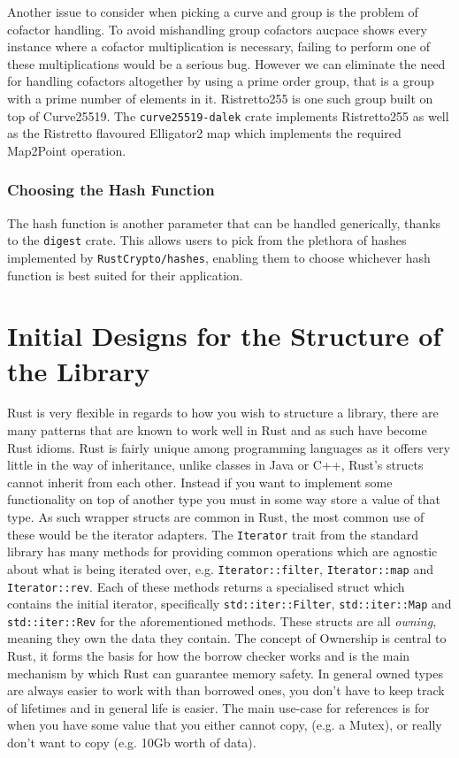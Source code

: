 Another issue to consider when picking a curve and group is the problem of cofactor handling.
To avoid mishandling group cofactors \gls{aucpace} shows every instance where a cofactor multiplication is necessary, failing to perform one of these multiplications would be a serious bug.
However we can eliminate the need for handling cofactors altogether by using a prime order group, that is a group with a prime number of elements in it.
Ristretto255 \cite{ristretto255} is one such group built on top of Curve25519.
The \texttt{curve25519-dalek} crate implements Ristretto255 as well as the Ristretto flavoured Elligator2 map \cite{elligator2} which implements the required \textsf{Map2Point} operation.

\subsubsection{Choosing the Hash Function}
The hash function is another parameter that can be handled generically, thanks to the \texttt{digest} crate.
This allows users to pick from the plethora of hashes implemented by \texttt{RustCrypto/hashes}, enabling them to choose whichever hash function is best suited for their application.

\section{Initial Designs for the Structure of the Library}
Rust is very flexible in regards to how you wish to structure a library, there are many patterns that are known to work well in Rust and as such have become Rust idioms.
Rust is fairly unique among programming languages as it offers very little in the way of inheritance, unlike classes in Java or C++, Rust's structs cannot inherit from each other.
Instead if you want to implement some functionality on top of another type you must in some way store a value of that type.
As such wrapper structs are common in Rust, the most common use of these would be the iterator adapters.
The \texttt{Iterator} trait from the standard library has many methods for providing common operations which are agnostic about what is being iterated over, e.g. \texttt{Iterator::filter}, \texttt{Iterator::map} and \texttt{Iterator::rev}.
Each of these methods returns a specialised struct which contains the initial iterator, specifically \texttt{std::iter::Filter}, \texttt{std::iter::Map} and \texttt{std::iter::Rev} for the aforementioned methods.
These structs are all \textit{owning}, meaning they own the data they contain.
The concept of Ownership is central to Rust, it forms the basis for how the borrow checker works and is the main mechanism by which Rust can guarantee memory safety.
In general owned types are always easier to work with than borrowed ones, you don't have to keep track of lifetimes and in general life is easier.
The main use-case for references is for when you have some value that you either cannot copy, (e.g. a Mutex), or really don't want to copy (e.g. 10Gb worth of data).

